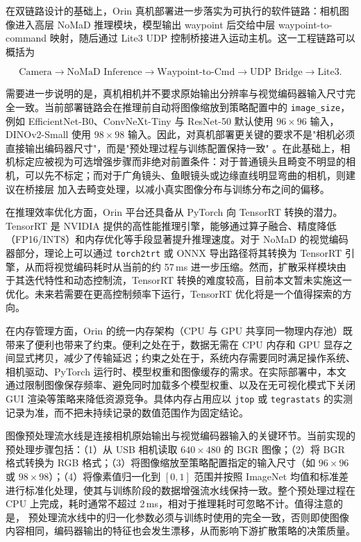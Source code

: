 在双链路设计的基础上，Orin 真机部署进一步落实为可执行的软件链路：相机图像进入高层 NoMaD 推理模块，模型输出 waypoint 后交给中层 waypoint-to-command 映射，随后通过 Lite3 UDP 控制桥接进入运动主机。这一工程链路可以概括为

\begin{equation}
\text{Camera} \rightarrow \text{NoMaD Inference} \rightarrow \text{Waypoint-to-Cmd} \rightarrow \text{UDP Bridge} \rightarrow \text{Lite3}.
\end{equation}

需要进一步说明的是，真机相机并不要求原始输出分辨率与视觉编码器输入尺寸完全一致。当前部署链路会在推理前自动将图像缩放到策略配置中的
\texttt{image\_size}，例如 EfficientNet-B0、ConvNeXt-Tiny 与 ResNet-50 默认使用 $96\times96$
输入，DINOv2-Small 使用 $98\times98$ 输入。因此，对真机部署更关键的要求不是"相机必须直接输出编码器尺寸"，而是"预处理过程与训练配置保持一致"
。在此基础上，相机标定应被视为可选增强步骤而非绝对前置条件：对于普通镜头且畸变不明显的相机，可以先不标定；而对于广角镜头、鱼眼镜头或边缘直线明显弯曲的相机，则建议在桥接层
加入去畸变处理，以减小真实图像分布与训练分布之间的偏移。

在推理效率优化方面，Orin 平台还具备从 PyTorch 向 TensorRT 转换的潜力。TensorRT 是 NVIDIA
提供的高性能推理引擎，能够通过算子融合、精度降低（FP16/INT8）和内存优化等手段显著提升推理速度。对于 NoMaD 的视觉编码器部分，理论上可以通过
\texttt{torch2trt} 或 ONNX 导出路径将其转换为 TensorRT 引擎，从而将视觉编码耗时从当前的约 57\,ms
进一步压缩。然而，扩散采样模块由于其迭代特性和动态控制流，TensorRT 转换的难度较高，目前本文暂未实施这一优化。未来若需要在更高控制频率下运行，TensorRT
优化将是一个值得探索的方向。

在内存管理方面，Orin 的统一内存架构（CPU 与 GPU 共享同一物理内存池）既带来了便利也带来了约束。便利之处在于，数据无需在 CPU 内存和 GPU
显存之间显式拷贝，减少了传输延迟；约束之处在于，系统内存需要同时满足操作系统、相机驱动、PyTorch
运行时、模型权重和图像缓存的需求。在实际部署中，本文通过限制图像保存频率、避免同时加载多个模型权重、以及在无可视化模式下关闭 GUI
渲染等策略来降低资源竞争。具体内存占用应以 \texttt{jtop} 或 \texttt{tegrastats} 的实测记录为准，而不把未持续记录的数值范围作为固定结论。

图像预处理流水线是连接相机原始输出与视觉编码器输入的关键环节。当前实现的预处理步骤包括：（1）从 USB 相机读取 $640\times480$ 的 BGR
图像；（2）将 BGR 格式转换为 RGB 格式；（3）将图像缩放至策略配置指定的输入尺寸（如 $96\times96$ 或
$98\times98$）；（4）将像素值归一化到 $[0,1]$ 范围并按照 ImageNet
均值和标准差进行标准化处理，使其与训练阶段的数据增强流水线保持一致。整个预处理过程在 CPU 上完成，耗时通常不超过 2\,ms，相对于推理耗时可忽略不计。值得注意的是，
预处理流水线中的归一化参数必须与训练时使用的完全一致，否则即使图像内容相同，编码器输出的特征也会发生漂移，从而影响下游扩散策略的决策质量。

